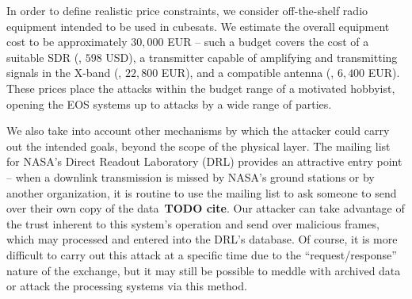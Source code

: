 In order to define realistic price constraints, we consider off-the-shelf radio equipment intended to be used in cubesats.
We estimate the overall equipment cost to be approximately $30,000$ EUR -- such a budget covers the cost of a suitable SDR (\cite{limeSdr,limeCompanion}, $598$ USD), a transmitter capable of amplifying and transmitting signals in the X-band (\cite{endurosat:xbandtransmitter}, $22,800$ EUR), and a compatible antenna (\cite{endurosat:xbandantenna}, $6,400$ EUR).
These prices place the attacks within the budget range of a motivated hobbyist, opening the EOS systems up to attacks by a wide range of parties.

We also take into account other mechanisms by which the attacker could carry out the intended goals, beyond the scope of the physical layer.
The mailing list for NASA's Direct Readout Laboratory (DRL) provides an attractive entry point -- when a downlink transmission is missed by NASA's ground stations or by another organization, it is routine to use the mailing list to ask someone to send over their own copy of the data~\textbf{TODO cite}. %
Our attacker can take advantage of the trust inherent to this system's operation and send over malicious frames, which may processed and entered into the DRL's database.
Of course, it is more difficult to carry out this attack at a specific time due to the ``request/response'' nature of the exchange, but it may still be possible to meddle with archived data or attack the processing systems via this method.
